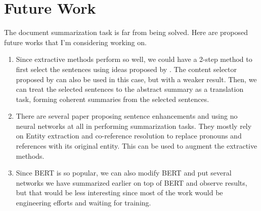 \documentclass[11pt,a4paper]{article}
\begin{document}
\section{Future Work}
The document summarization task is far from being solved. Here are proposed future works that I'm considering working on.

\begin{enumerate}
	\item Since extractive methods perform so well, we could have a 2-step method to first select the sentences using ideas proposed by \cite{al2018hierarchical}. The content selector proposed by \cite{bottom-up} can also be used in this case, but with a weaker result. Then, we can treat the selected sentences to the abstract summary as a translation task, forming coherent summaries from the selected sentences.
	\item There are several paper proposing sentence enhancements and using no neural networks at all in performing summarization tasks. They mostly rely on Entity extraction and co-reference resolution to replace pronouns and references with its original entity. This can be used to augment the extractive methods.
	\item Since BERT is so popular, we can also modify BERT and put several networks we have summarized earlier on top of BERT and observe results, but that would be less interesting since most of the work would be engineering efforts and waiting for training.
\end{enumerate}

\newpage


\end{document}
